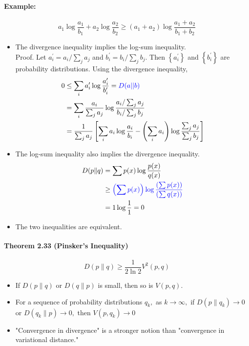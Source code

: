 \documentclass[8pt]{article}
\begin{document}
\paragraph{Example:}
$$
a_{1} \log \frac{a_{1}}{b_{1}}+a_{2} \log \frac{a_{2}}{b_{2}} \geq\left(a_{1}+a_{2}\right) \log \frac{a_{1}+a_{2}}{b_{1}+b_{2}}
$$
\begin{itemize}
	\item The divergence inequality implies the log-sum inequality.\\
Proof. Let $a_{i}^{\prime}=a_{i} / \sum_{j} a_{j}$ and $b_{i}^{\prime}=b_{i} / \sum_{j} b_{j} .$ Then $\left\{a_{i}^{\prime}\right\}$ and $\left\{b_{i}^{\prime}\right\}$ are probability distributions. Using the divergence inequality,
$$
\begin{aligned}
0 & \leq \sum_{i} a_{i}^{\prime} \log \frac{a_{i}^{\prime}}{b_{i}^{\prime}} = \color{blue} D(a || b)\\
&=\sum_{i} \frac{a_{i}}{\sum_{j} a_{j}} \log \frac{a_{i} / \sum_{j} a_{j}}{b_{i} / \sum_{j} b_{j}} \\
&=\frac{1}{\sum_{j} a_{j}}\left[\sum_{i} a_{i} \log \frac{a_{i}}{b_{i}}-\left(\sum_{i} a_{i}\right) \log \frac{\sum_{j} a_{j}}{\sum_{j} b_{j}}\right]
\end{aligned}
$$
	\item The log-sum inequality also implies the divergence inequality.
$$
\begin{aligned}
D(p \| q) &=\sum p(x) \log \frac{p(x)}{q(x)} \\
& \geq \color{blue} \left(\sum p(x)\right) \log \frac{\left(\sum p(x)\right)}{\left(\sum q(x)\right)} \\
&=1 \log \frac{1}{1}=0
\end{aligned}
$$

	\item The two inequalities are equivalent.
\end{itemize}

\begin{tcolorbox}
\paragraph{Theorem 2.33 (Pinsker's Inequality)}
$$
D(p \| q) \geq \frac{1}{2 \ln 2} V^{2}(p, q)
$$
\end{tcolorbox}
\begin{itemize}
	\item  If $D(p \| q)$ or $D(q \| p)$ is small, then so is $V(p, q)$.
	\item For a sequence of probability distributions $q_{k},$ as $k \rightarrow \infty,$ if $D\left(p \| q_{k}\right) \rightarrow 0$ or $D\left(q_{k} \| p\right) \rightarrow 0,$ then $V\left(p, q_{k}\right) \rightarrow 0$
	\item "Convergence in divergence" is a stronger notion than "convergence in variational distance."
\end{itemize}
\end{document}
